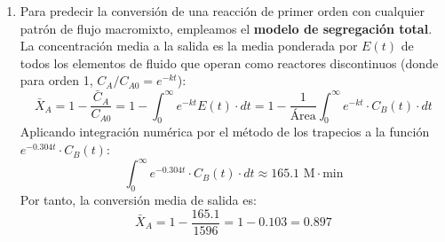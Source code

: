 \begin{enumerate}[label=\alph*)]
	\item Para predecir la conversión de una reacción de primer orden con cualquier patrón de flujo macromixto, empleamos el \textbf{modelo de segregación total}. La concentración media a la salida es la media ponderada por $E(t)$ de todos los elementos de fluido que operan como reactores discontinuos (donde para orden 1, $C_{A}/C_{A0} = e^{-kt}$):
	      \begin{equation*}
		      \bar{X}_A = 1 - \frac{\bar{C}_A}{C_{A0}} = 1 - \int_0^\infty e^{-kt} E(t) \cdot dt = 1 - \frac{1}{\text{Área}} \int_0^\infty e^{-kt} \cdot C_B(t) \cdot dt
	      \end{equation*}
	      Aplicando integración numérica por el método de los trapecios a la función $e^{-0.304 t} \cdot C_B(t)$:
	      \begin{equation*}
		      \int_0^\infty e^{-0.304 t} \cdot C_B(t) \cdot dt \approx 165.1 \text{ M}\cdot\text{min}
	      \end{equation*}
	      Por tanto, la conversión media de salida es:
	      \begin{equation*}
		      \bar{X}_A = 1 - \frac{165.1}{1596} = 1 - 0.103 = 0.897
	      \end{equation*}
	      \begin{center}
	      \end{center}
\end{enumerate}

